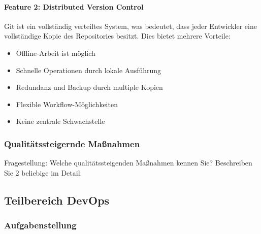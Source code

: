     \paragraph{Feature 2: Distributed Version Control}
    Git ist ein vollständig verteiltes System, was bedeutet, dass jeder Entwickler eine vollständige Kopie des Repositories besitzt. Dies bietet mehrere Vorteile:

    \begin{itemize}
        \item Offline-Arbeit ist möglich
        \item Schnelle Operationen durch lokale Ausführung
        \item Redundanz und Backup durch multiple Kopien
        \item Flexible Workflow-Möglichkeiten
        \item Keine zentrale Schwachstelle
    \end{itemize}






\subsubsection{Qualitätssteigernde Maßnahmen}

Fragestellung: Welche qualitätssteigenden Maßnahmen kennen Sie? Beschreiben Sie 2 beliebige im Detail.



\subsection{Teilbereich DevOps}

\subsubsection{Aufgabenstellung}

